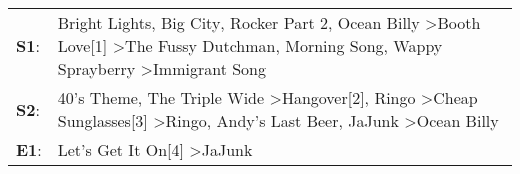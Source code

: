 \begin{supertabular}{p{0.03\textwidth}p{0.92\textwidth}}
 \textbf{S1}:  &                     Bright Lights, Big City\textsuperscript{}, \enspace Rocker Part 2\textsuperscript{}, \enspace Ocean Billy\textsuperscript{} \textgreater \enspace Booth Love[1]\textsuperscript{} \textgreater \enspace The Fussy Dutchman\textsuperscript{}, \enspace Morning Song\textsuperscript{}, \enspace Wappy Sprayberry\textsuperscript{} \textgreater \enspace Immigrant Song\textsuperscript{}  \enspace  \\
 \textbf{S2}:  &  40's Theme\textsuperscript{}, \enspace The Triple Wide\textsuperscript{} \textgreater \enspace Hangover[2]\textsuperscript{}, \enspace Ringo\textsuperscript{} \textgreater \enspace Cheap Sunglasses[3]\textsuperscript{} \textgreater \enspace Ringo\textsuperscript{}, \enspace Andy's Last Beer\textsuperscript{}, \enspace JaJunk\textsuperscript{} \textgreater \enspace Ocean Billy\textsuperscript{}  \enspace  \\
 \textbf{E1}:  &                                                                                                                                                                                                                                                                                                                           Let's Get It On[4]\textsuperscript{} \textgreater \enspace JaJunk\textsuperscript{}  \enspace  \\
\end{supertabular}
